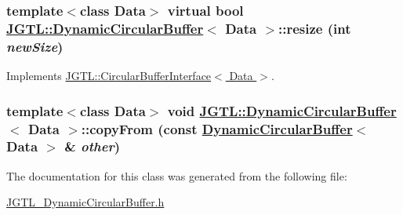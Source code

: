 \hypertarget{class_j_g_t_l_1_1_dynamic_circular_buffer_2ea8f91e985c5fec04eb8ef05898240a}{
\subsubsection[resize]{\setlength{\rightskip}{0pt plus 5cm}template$<$class Data$>$ virtual bool \hyperlink{class_j_g_t_l_1_1_dynamic_circular_buffer}{JGTL::Dynamic\-Circular\-Buffer}$<$ Data $>$::resize (int {\em new\-Size})}}
\label{class_j_g_t_l_1_1_dynamic_circular_buffer_2ea8f91e985c5fec04eb8ef05898240a}




Implements \hyperlink{class_j_g_t_l_1_1_circular_buffer_interface_c6976a1811fdeb5b1810e379022f67ba}{JGTL::Circular\-Buffer\-Interface$<$ Data $>$}.\hypertarget{class_j_g_t_l_1_1_dynamic_circular_buffer_5a81d3d91868e9c3ab1816583444984f}{
\subsubsection[copyFrom]{\setlength{\rightskip}{0pt plus 5cm}template$<$class Data$>$ void \hyperlink{class_j_g_t_l_1_1_dynamic_circular_buffer}{JGTL::Dynamic\-Circular\-Buffer}$<$ Data $>$::copy\-From (const \hyperlink{class_j_g_t_l_1_1_dynamic_circular_buffer}{Dynamic\-Circular\-Buffer}$<$ Data $>$ \& {\em other})}}
\label{class_j_g_t_l_1_1_dynamic_circular_buffer_5a81d3d91868e9c3ab1816583444984f}




The documentation for this class was generated from the following file:\begin{CompactItemize}
\item 
\hyperlink{_j_g_t_l___dynamic_circular_buffer_8h}{JGTL\_\-Dynamic\-Circular\-Buffer.h}\end{CompactItemize}
